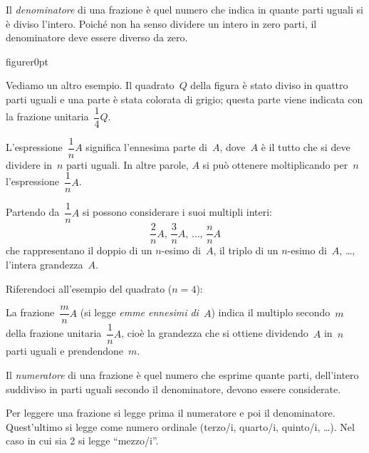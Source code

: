 \begin{center}
 
\end{center}


\osservazione
Il \emph{denominatore} di una frazione è quel numero che indica in quante parti uguali si è diviso l'intero.
Poiché non ha senso dividere un intero in zero parti, il denominatore deve essere diverso da zero.

\begin{wrapfloat}{figure}{r}{0pt}
 
\end{wrapfloat}

Vediamo un altro esempio. Il quadrato~$Q$ della figura è stato diviso in quattro parti uguali e
una parte è stata colorata di grigio; questa parte viene indicata con la frazione unitaria~$\dfrac{1}{4}Q$.

L'espressione~$\dfrac{1}{n}A$ significa l'ennesima parte di~$A$, dove~$A$ è il tutto che si deve dividere in~$n$ parti uguali.
In altre parole,
$A$ si può ottenere moltiplicando per~$n$ l'espressione~$\dfrac{1}{n}A$.

Partendo da~$\dfrac{1}{n}A$ si possono considerare i suoi multipli interi:
\[\frac{2}{n}A\text{, }\frac{3}{n}A\text{, }\ldots\text{, }\frac{n}{n}A\] che rappresentano il
doppio di un $n$-esimo di~$A$, il triplo di un $n$-esimo di~$A$, \ldots, l'intera grandezza~$A$.

Riferendoci all'esempio del quadrato ($n=4$):
\begin{center}
 
\end{center}

La frazione~$\dfrac{m}{n}A$ (si legge \emph{emme ennesimi di}~$A$) indica il multiplo secondo~$m$
della frazione unitaria~$\dfrac{1}{n}A$, cioè la grandezza che si ottiene dividendo~$A$ in~$n$ parti uguali e prendendone~$m$.

\osservazione
 Il \emph{numeratore} di una frazione è quel numero che esprime quante parti, dell'intero suddiviso
in parti uguali secondo il denominatore, devono essere considerate.

Per leggere una frazione si legge prima il numeratore e poi il denominatore.
Quest'ultimo si legge come numero ordinale (terzo/i, quarto/i, quinto/i, \ldots).
Nel caso in cui sia 2 si legge ``mezzo/i''.

